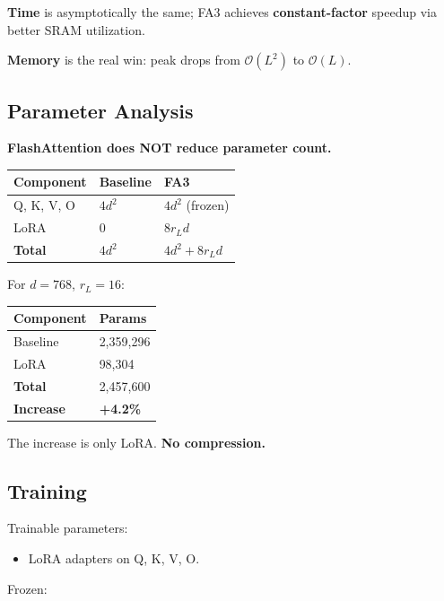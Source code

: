 \textbf{Time} is asymptotically the same; FA3 achieves \textbf{constant-factor} 
speedup via better SRAM utilization.

\textbf{Memory} is the real win: peak drops from $\mathcal{O}(L^2)$ to 
$\mathcal{O}(L)$.

\subsection{Parameter Analysis}

\textbf{FlashAttention does NOT reduce parameter count.}

\begin{table}[H]
\centering
\small
\begin{tabular}{lll}
\toprule
\textbf{Component} & \textbf{Baseline} & \textbf{FA3} \\
\midrule
Q, K, V, O & $4 d^2$ & $4 d^2$ (frozen) \\
LoRA & 0 & $8 r_L d$ \\
\textbf{Total} & $4 d^2$ & $4 d^2 + 8 r_L d$ \\
\bottomrule
\end{tabular}
\end{table}

For $d = 768$, $r_L = 16$:

\begin{table}[H]
\centering
\small
\begin{tabular}{ll}
\toprule
\textbf{Component} & \textbf{Params} \\
\midrule
Baseline & 2,359,296 \\
LoRA & 98,304 \\
\textbf{Total} & 2,457,600 \\
\textbf{Increase} & \textbf{+4.2\%} \\
\bottomrule
\end{tabular}
\end{table}

The increase is only LoRA. \textbf{No compression.}

\subsection{Training}

Trainable parameters:

\begin{itemize}
\item LoRA adapters on Q, K, V, O.

\end{itemize}
Frozen:

